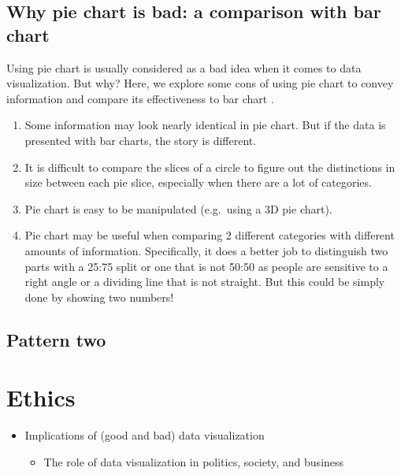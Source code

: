 \documentclass[]{book}
\providecommand{\tightlist}{%
  \setlength{\itemsep}{0pt}\setlength{\parskip}{0pt}}
\theoremstyle{definition}
\theoremstyle{definition}
\theoremstyle{definition}
\theoremstyle{remark}
\begin{document}
\section{Why pie chart is bad: a comparison with bar
chart}\label{why-pie-chart-is-bad-a-comparison-with-bar-chart}

Using pie chart is usually considered as a bad idea when it comes to
data visualization. But why? Here, we explore some cons of using pie
chart to convey information and compare its effectiveness to bar chart
\citep{hickey-pie-worst} \citep{henry-defense-pie} \citep{quach-penny}.

\begin{enumerate}
\def\labelenumi{\arabic{enumi}.}
\item
  Some information may look nearly identical in pie chart. But if the
  data is presented with bar charts, the story is different.
\item
  It is difficult to compare the slices of a circle to figure out the
  distinctions in size between each pie slice, especially when there are
  a lot of categories.
\item
  Pie chart is easy to be manipulated (e.g.~using a 3D pie chart).
\item
  Pie chart may be useful when comparing 2 different categories with
  different amounts of information. Specifically, it does a better job
  to distinguish two parts with a 25:75 split or one that is not 50:50
  as people are sensitive to a right angle or a dividing line that is
  not straight. But this could be simply done by showing two numbers!
\end{enumerate}

\section{Pattern two}\label{pattern-two}

\chapter{Ethics}\label{ethics}

\begin{itemize}
\tightlist
\item
  Implications of (good and bad) data visualization

  \begin{itemize}
  \tightlist
  \item
    The role of data visualization in politics, society, and business
  \end{itemize}
\end{itemize}
\end{document}

